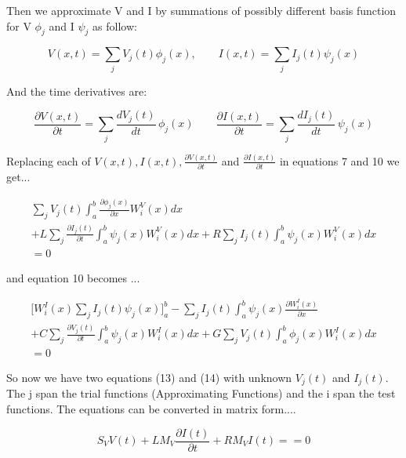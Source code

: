 \documentclass[12pt, letterpaper]{article}
\begin{document}
Then we approximate V and I by summations of possibly different basis function for V $\phi_j$ and I $\psi_j$ as follow:

\begin{equation}
	V(x, t) = \sum_j V_j(t) \phi_j(x), 
	\qquad
	I(x, t) = \sum_j I_j(t) \psi_j(x) 
\end{equation}

And the time derivatives are:

\begin{equation}
	\frac{\partial V(x, t)}{\partial t}
	= \sum_{j} \frac{d V_j(t)}{dt}\,\phi_j(x)
	\qquad
	\frac{\partial I(x, t)}{\partial t}
	= \sum_{j} \frac{d I_j(t)}{dt}\,\psi_j(x)
\end{equation}

Replacing each of $V(x, t), I(x, t), \frac{\partial V(x, t)}{\partial t}$ and $\frac{\partial I(x, t)}{\partial t}$ in equations 7 and 10 we get...

\begin{equation}
	\begin{aligned}
		 \sum_j V_j(t) \int_a^b \frac{\partial{\phi_j(x)}}{\partial{x}}  W^V_i(x) dx \\
		+ L  \sum_j \frac{\partial{I_j(t)}}{\partial t}    \int_a^b \psi_j(x) W^V_i(x) dx 
		+  R  \sum_j I_j(t) \int_a^b \psi_j(x) W^V_i(x) dx \\
		= 0
	\end{aligned}
\end{equation}

and equation 10 becomes ...

\begin{equation}
	\begin{aligned}
		\Big[W^I_i(x) \sum_j I_j(t) \psi_j(x)  \Big]_a^b
		- \sum_j I_j(t) 	\int_a^b \psi_j(x) \frac{\partial{W^I_i(x)}}{\partial{x}} \\
		+ C  \sum_j  \frac{\partial{V_j(t)}}{\partial{t}} \int_a^b \psi_j(x) W^I_i(x) dx
		+ G  \sum_j V_j(t) \int_a^b \phi_j(x) W^I_i(x) dx\\
		= 0
	\end{aligned}
\end{equation}

So now we have two equations (13) and (14) with unknown $V_j(t)$ and $I_j(t)$.\\

The j span the trial functions (Approximating Functions) and the i span the test functions. The equations can be converted in matrix form....

\begin{equation}
	S_V V(t) + L M_V \frac{\partial I(t)}{\partial t} + R M_V I(t) = 
	= 0
\end{equation}
\end{document}

